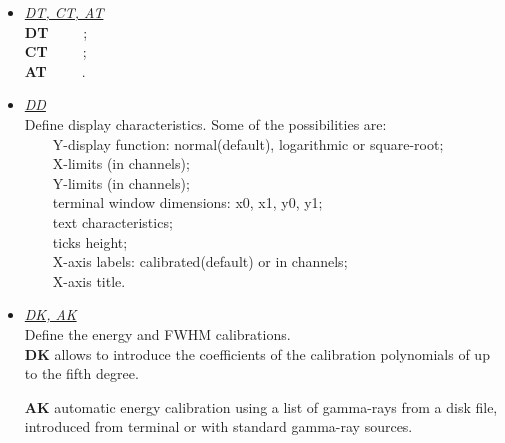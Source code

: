 \begin{itemize}
	{\bf DW}~~~~~define cut limits from terminal or file;\\
	{\bf MW}~~~~~show cut limits;\\
	{\bf ZW}~~~~~delete cut limits;\\
	{\bf CW}~~~~~execute cut;\\
	{\bf ~Q}~~~~~return to the total matrix projection.

	{\bf CW} works in two ways:\\
	~~~~~~~~1) common backgound subtraction: all markers define peaks\\
	~~~~~~~~2) normal backgound subtraction: first two markers define the peak\\
	~~~~~~~~~~~~~~~~~~~~~~~~~~~~~~~~~~~~~~~~~all the others define the background
	
 \item	{\it\underline{DT, CT, AT}} \\

	{\bf DT}~~~~~;\\
	{\bf CT}~~~~~;\\
	{\bf AT}~~~~~.

 \item	{\it\underline{DD}} \\

	Define display characteristics. Some of the possibilities are:\\
	~~~~Y-display function: normal(default), logarithmic or square-root;\\
	~~~~X-limits (in channels);\\
	~~~~Y-limits (in channels);\\
	~~~~terminal window dimensions: x0, x1, y0, y1;\\
	~~~~text characteristics;\\
	~~~~ticks height;\\
	~~~~X-axis labels: calibrated(default) or in channels;\\
	~~~~X-axis title.

 \item	{\it\underline{DK, AK}} \\

	Define the energy and FWHM  calibrations.\\

	{\bf DK} allows to introduce the coefficients of the calibration 
	polynomials of up \\ 
	\hskip1cm to the fifth degree.

	{\bf AK} automatic energy calibration using a list of gamma-rays from a
	disk file, \\
	\hskip1cm introduced from terminal or with standard gamma-ray sources. 


\end{itemize}
